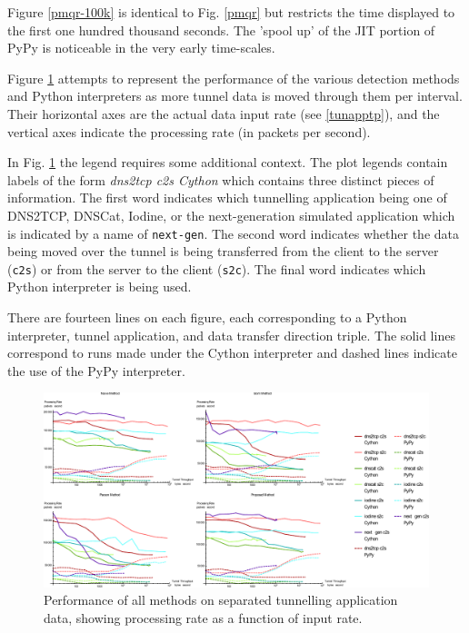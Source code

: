 \documentclass{llncs}
\begin{document}
Figure \ref{pmqr-100k} is identical to Fig. \ref{pmqr} but restricts the time
displayed to the first one hundred thousand seconds. The 'spool up' of the JIT
portion of PyPy is noticeable in the very early time-scales.


Figure \ref{ppia-all} attempts
to represent the performance of the various
detection methods and Python interpreters as more tunnel data is moved through
them per interval. Their horizontal axes are the actual data input rate (see \ref{tunapptp}), and the vertical axes indicate the
processing rate (in packets per second).

In Fig. \ref{ppia-all} the legend requires some additional context. The
plot legends contain labels of the form \emph{dns2tcp c2s Cython} which contains
three distinct pieces of information. The first word indicates which tunnelling
application being one of DNS2TCP, DNSCat, Iodine, or the next-generation simulated application which is indicated by a name of \texttt{next-gen}. The
second word indicates whether the data being moved over the tunnel is being
transferred from the client to the server (\texttt{c2s}) or from the server to
the client (\texttt{s2c}). The final word indicates which Python interpreter is
being used.

There are fourteen lines on each figure, each corresponding to a Python
interpreter, tunnel application, and data transfer direction triple. The solid
lines correspond to runs made under the Cython interpreter and dashed lines
indicate the use of the PyPy interpreter.

\begin{figure}
\centering
\includegraphics[width=\textwidth]{../figures/ppia-all.pdf}
\caption[Performance of Alls Method on Tunnel Data by Python
Interpreter]{Performance of all methods on separated tunnelling application
data, showing processing rate as a function of input rate.}
\label{ppia-all}
\end{figure}
\end{document}
